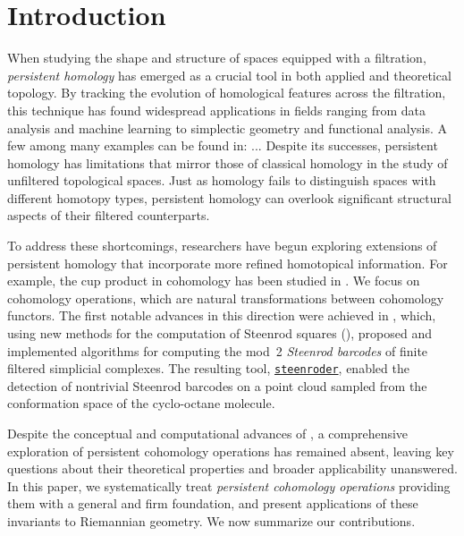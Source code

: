 
\section{Introduction} \label{s:introduction}

When studying the shape and structure of spaces equipped with a filtration, \textit{persistent homology} has emerged as a crucial tool in both applied and theoretical topology.
By tracking the evolution of homological features across the filtration, this technique has found widespread applications in fields ranging from data analysis and machine learning to simplectic geometry and functional analysis.
A few among many examples can be found in: ... 
Despite its successes, persistent homology has limitations that mirror those of classical homology in the study of unfiltered topological spaces.
Just as homology fails to distinguish spaces with different homotopy types, persistent homology can overlook significant structural aspects of their filtered counterparts.

To address these shortcomings, researchers have begun exploring extensions of persistent homology that incorporate more refined homotopical information.
For example, the cup product in cohomology has been studied in \cite{contessoto_et_al:LIPIcs.SoCG.2022.31, memoli2024persistent, huang2005cup, yarmola2010persistence, herscovich2018higher, belchi2021a, contreras2022persistent}.
We focus on cohomology operations, which are natural transformations between cohomology functors.
The first notable advances in this direction were achieved in \cite{medina2022per_st}, which, using new methods for the computation of Steenrod squares (\cite{medina2023fast_sq}), proposed and implemented algorithms for computing the mod~2 \textit{Steenrod barcodes} of finite filtered simplicial complexes.
The resulting tool, \href{https://steenroder.github.io/steenroder/}{\texttt{steenroder}}, enabled the detection of nontrivial Steenrod barcodes on a point cloud sampled from the conformation space of the cyclo-octane molecule.

Despite the conceptual and computational advances of \cite{medina2022per_st}, a comprehensive exploration of persistent cohomology operations has remained absent, leaving key questions about their theoretical properties and broader applicability unanswered.
In this paper, we systematically treat \textit{persistent cohomology operations} providing them with a general and firm foundation, and present applications of these invariants to Riemannian geometry.
We now summarize our contributions.

